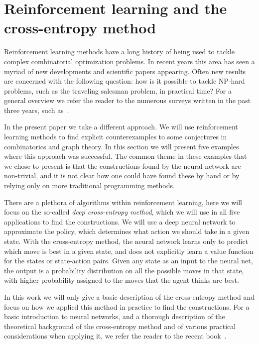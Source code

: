\documentclass[11pt,english]{article}
\theoremstyle{plain}
\theoremstyle{remark}
\begin{document}
\section{Reinforcement learning and the cross-entropy method}\label{sec:neural}

Reinforcement learning methods have a long history of being used to tackle complex combinatorial optimization problems. In recent years this area has seen a myriad of new developments and scientific papers appearing. Often new results are concerned with the following question: how is it possible to tackle NP-hard problems, such as the traveling salesman problem, in practical time? For a general overview we refer the reader to the numerous  surveys written in the past three years, such as~\cite{nnsurvey1,nnsurvey2,nnsurvey3,nnsurvey4}. 

In the present paper we take a  different approach. We will use reinforcement learning methods to find explicit counterexamples to some conjectures in combinatorics and graph theory. In this section we will present five examples where this approach was successful. The common theme in these examples that we chose to present is that the constructions found by the neural network are  non-trivial, and it is not clear how one could have found these by hand or by relying only on more traditional programming methods.

There are a plethora of algorithms within reinforcement learning, here we will focus on the so-called \emph{deep cross-entropy method}, which we will use in all five applications to find the constructions. We will use a deep neural network to approximate the policy, which determines what action we should take in a given state. With the cross-entropy method, the neural network learns only to predict which move is best in a given state, and does not explicitly learn a value function for the states or state-action pairs. Given any state as an input to the neural net, the output is a probability distribution on all the possible moves in that state, with higher probability assigned to the moves that the agent thinks are best.

In this work we will only give a basic description of the cross-entropy method and focus on how we applied this method in practice to find the constructions. For a basic introduction to neural networks, and a thorough description of the theoretical background of the cross-entropy method and of various practical considerations when applying it, we refer the reader to the recent book~\cite[Chapter 4]{lapan2020deep}.
\end{document}
